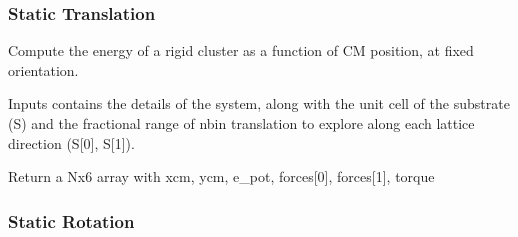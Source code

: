 \documentclass[letterpaper,10pt,english]{sphinxmanual}
\begin{document}
\subsubsection{Static Translation}
\label{\detokenize{static_trasl_map:module-static_trasl_map}}\label{\detokenize{static_trasl_map:static-translation}}\label{\detokenize{static_trasl_map::doc}}

\begin{fulllineitems}
\label{\detokenize{static_trasl_map:static_trasl_map.static_traslmap}}
\pysigstartsignatures
{}
\pysigstopsignatures
\sphinxAtStartPar
Compute the energy of a rigid cluster as a function of CM position, at fixed orientation.

\sphinxAtStartPar
Inputs contains the details of the system, along with the unit cell of the substrate (S) and the fractional range of nbin translation to explore along each lattice direction (S{[}0{]}, S{[}1{]}).

\sphinxAtStartPar
Return a Nx6 array with xcm, ycm, e\_pot, forces{[}0{]}, forces{[}1{]}, torque

\end{fulllineitems}


\sphinxstepscope


\subsubsection{Static Rotation}
\label{\detokenize{static_roto_map:module-static_roto_map}}\label{\detokenize{static_roto_map:static-rotation}}\label{\detokenize{static_roto_map::doc}}
\end{document}
